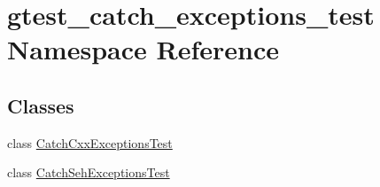 \hypertarget{namespacegtest__catch__exceptions__test}{}\section{gtest\+\_\+catch\+\_\+exceptions\+\_\+test Namespace Reference}
\label{namespacegtest__catch__exceptions__test}
\subsection*{Classes}
\begin{DoxyCompactItemize}
\item 
class \hyperlink{classgtest__catch__exceptions__test_1_1CatchCxxExceptionsTest}{Catch\+Cxx\+Exceptions\+Test}
\item 
class \hyperlink{classgtest__catch__exceptions__test_1_1CatchSehExceptionsTest}{Catch\+Seh\+Exceptions\+Test}
\end{DoxyCompactItemize}
